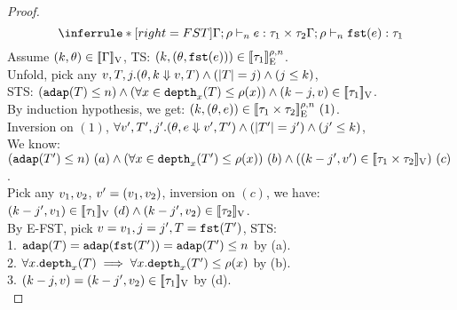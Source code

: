 \documentclass[a4paper,11pt]{article}
\theoremstyle{definition}
\begin{document}
\begin{proof}
\[
    \inferrule*[right = FST]{
      \Gamma; \dmap \tvdash{\nnatA} \expr: \type_1 \times \type_2
    }{
      \Gamma; \dmap \tvdash{\nnatA} \eprojl(\expr): \type_1
    }
\]
Assume $(k, \theta) \in [\![ \Gamma ]\!]_{\text{V}}$, TS: $(k, (\theta, \mathtt{fst}(e))) \in [\![ \tau_1 ]\!]_{\text{E}}^{\rho, n} $.\\
%
Unfold, pick any $ v, T, j. (\theta, k \mathrel{\Downarrow} v, T) \land (|T| = j) \land (j \leq k) $,\\
%
STS: $ (\mathtt{adap}(T) \leq n) \land (\forall x \in \mathtt{depth}_{x}(T) \leq \rho(x)) \land (k - j, v) \in [\![ \tau_1 ]\!]_{\text{V}} $.\\
%
By induction hypothesis, we get: $(k, (\theta, e)) \in [\![ \tau_1 \times \tau_2 ]\!]_{\text{E}}^{\rho, n} ~(1)$.\\
%
Inversion on $(1)$, $\forall v', T', j'. (\theta, e \mathrel{\Downarrow} v', T') \land (|T'| = j') \land (j' \leq k) $,\\
%
We know: $(\mathtt{adap}(T') \leq n) ~ (a) 
\land (\forall x \in \mathtt{depth}_{x}(T') \leq \rho(x)) ~ (b)
\land ((k - j', v') \in [\![ \tau_1 \times \tau_2 ]\!]_{\text{V}}) ~ (c)$.\\
%
Pick any $v_1, v_2$, $v' = (v_1, v_2)$,
%
inversion on $(c)$, we have:\\
%
$(k - j', v_1) \in [\![ \tau_1 ]\!]_{\text{V}}~(d) \land (k - j', v_2) \in [\![ \tau_2 ]\!]_{\text{V}}$.\\
%
By E-FST, pick $v = v_1, j = j', T = \mathtt{fst}(T')$, STS:\\
%
1. $\mathtt{adap}(T) = \mathtt{adap}(\mathtt{fst}(T')) = \mathtt{adap}(T') \leq n$ by (a).\\
%
2. $\forall x .\mathtt{depth}_{x}(T) \implies \forall x . \mathtt{depth}_{x}(T') \leq \rho(x)$ by (b).\\
%
3. $(k - j, v) = (k - j', v_2) \in
[\![ \tau_1 ]\!]_{\text{V}}$ by (d).
\\





\end{proof}
\end{document}
